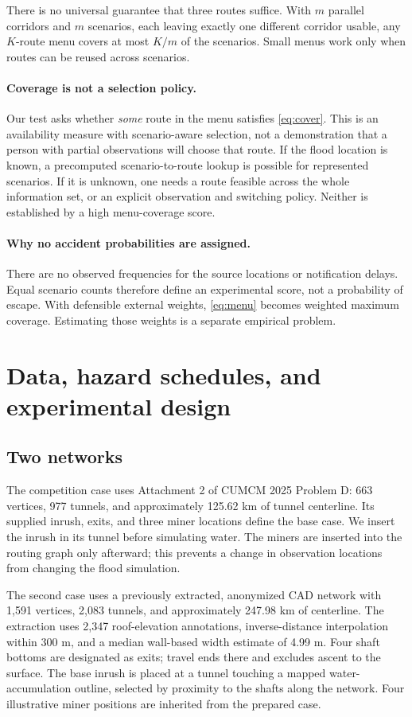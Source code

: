 \documentclass[11pt]{article}
\begin{document}
There is no universal guarantee that three routes suffice. With $m$ parallel corridors and $m$ scenarios, each leaving exactly one different corridor usable, any $K$-route menu covers at most $K/m$ of the scenarios. Small menus work only when routes can be reused across scenarios.

\paragraph{Coverage is not a selection policy.}
Our test asks whether \emph{some} route in the menu satisfies \eqref{eq:cover}. This is an availability measure with scenario-aware selection, not a demonstration that a person with partial observations will choose that route. If the flood location is known, a precomputed scenario-to-route lookup is possible for represented scenarios. If it is unknown, one needs a route feasible across the whole information set, or an explicit observation and switching policy. Neither is established by a high menu-coverage score.

\paragraph{Why no accident probabilities are assigned.}
There are no observed frequencies for the source locations or notification delays. Equal scenario counts therefore define an experimental score, not a probability of escape. With defensible external weights, \eqref{eq:menu} becomes weighted maximum coverage. Estimating those weights is a separate empirical problem.

\section{Data, hazard schedules, and experimental design}
\subsection{Two networks}
The competition case uses Attachment 2 of CUMCM 2025 Problem D: 663 vertices, 977 tunnels, and approximately 125.62 km of tunnel centerline. Its supplied inrush, exits, and three miner locations define the base case. We insert the inrush in its tunnel before simulating water. The miners are inserted into the routing graph only afterward; this prevents a change in observation locations from changing the flood simulation.

The second case uses a previously extracted, anonymized CAD network with 1,591 vertices, 2,083 tunnels, and approximately 247.98 km of centerline. The extraction uses 2,347 roof-elevation annotations, inverse-distance interpolation within 300 m, and a median wall-based width estimate of 4.99 m. Four shaft bottoms are designated as exits; travel ends there and excludes ascent to the surface. The base inrush is placed at a tunnel touching a mapped water-accumulation outline, selected by proximity to the shafts along the network. Four illustrative miner positions are inherited from the prepared case.
\end{document}

